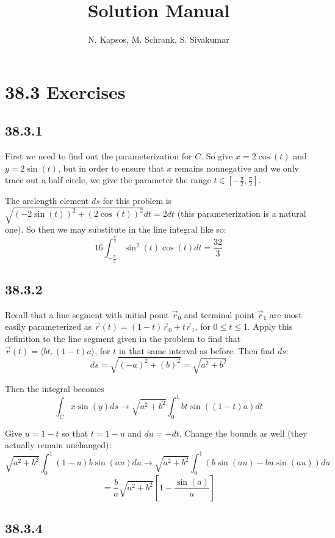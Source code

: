 \documentclass{article}
\title{Solution Manual}
\author{N. Kapsos, M. Schrank, S. Sivakumar}
\date{}
\begin{document}
\maketitle
\setcounter{secnumdepth}{0}

\section{38.3 Exercises}

\subsection{38.3.1}

First we need to find out the parameterization for $C$. So give $x=2\cos(t)$ and $y=2\sin(t)$, but in order to ensure that $x$ remains nonnegative and we only trace out a half circle, we give the parameter the range $t\in[-\frac{\pi}{2},\frac{\pi}{2}]$.

The arclength element $ds$ for this problem is $\sqrt{(-2\sin(t))^2+(2\cos(t))^2}dt = 2dt$ (this parameterization is a natural one). So then we may substitute in the line integral like so:
$$16\int_{-\frac{\pi}{2}}^{\frac{\pi}{2}}\sin^2(t)\cos(t)dt = \frac{32}{3}$$

\subsection{38.3.2}

Recall that a line segment with initial point $\vec{r}_0$ and terminal point $\vec{r}_1$ are most easily parameterized as $\vec{r}(t) = (1-t)\vec{r}_0 + t\vec{r}_1$, for $0\leq t \leq 1$. Apply this definition to the line segment given in the problem to find that $\vec{r}(t) = \langle bt,(1-t)a \rangle$, for $t$ in that same interval as before.
Then find $ds$:
$$ds = \sqrt{(-a)^2 + (b)^2} = \sqrt{a^2+b^2}$$

Then the integral becomes
$$\int_C x\sin(y)ds \to \sqrt{a^2+b^2}\int_0^1 bt\sin((1-t)a)dt$$

Give $u=1-t$ so that $t=1-u$ and $du=-dt$. Change the bounds as well (they actually remain unchanged):
$$\sqrt{a^2+b^2}\int_0^1 (1-u)b\sin(au)du \to \sqrt{a^2+b^2}\int_0^1 \left(b\sin(au)-bu\sin(au)\right)du$$
$$ = \frac{b}{a}\sqrt{a^2+b^2}\left[1-\frac{\sin(a)}{a}\right]$$

\subsection{38.3.4}
\end{document}
